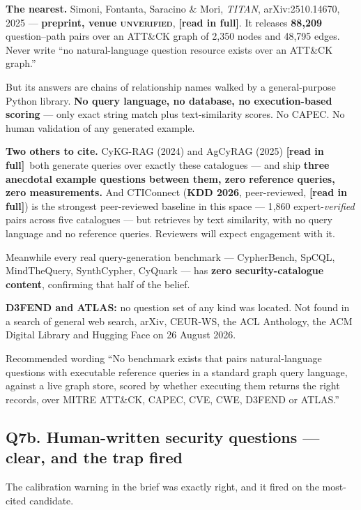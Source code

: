 \documentclass[11pt,a4paper]{article}
\newcommand{\vclear}{\textcolor{clear}{\textbf{clear}}}
\newcommand{\readtag}{\textcolor{standing}{\textbf{[read in full]}}}
\newcommand{\unver}{\textcolor{killed}{\textsc{unverified}}}
\begin{document}
\textbf{The nearest.} Simoni, Fontanta, Saracino \& Mori, \emph{TITAN},
arXiv:2510.14670, 2025 --- \textbf{preprint, venue \unver}, \readtag. It releases
\textbf{88{,}209} question--path pairs over an ATT\&CK graph of 2{,}350 nodes and
48{,}795 edges. Never write ``no natural-language question resource exists over an
ATT\&CK graph.''

But its answers are chains of relationship names walked by a general-purpose Python
library. \textbf{No query language, no database, no execution-based scoring} --- only
exact string match plus text-similarity scores. No CAPEC. No human validation of any
generated example.

\textbf{Two others to cite.} CyKG-RAG (2024) and AgCyRAG (2025) \readtag\ both
generate queries over exactly these catalogues --- and ship \textbf{three anecdotal
example questions between them, zero reference queries, zero measurements.} And
CTIConnect (\textbf{KDD 2026}, peer-reviewed, \readtag) is the strongest
peer-reviewed baseline in this space --- 1{,}860 expert-\emph{verified} pairs across
five catalogues --- but retrieves by text similarity, with no query language and no
reference queries. Reviewers will expect engagement with it.

Meanwhile every real query-generation benchmark --- CypherBench, SpCQL,
MindTheQuery, SynthCypher, CyQuark --- has \textbf{zero security-catalogue content},
confirming that half of the belief.

\textbf{D3FEND and ATLAS:} no question set of any kind was located. Not found in a
search of general web search, arXiv, CEUR-WS, the ACL Anthology, the ACM Digital
Library and Hugging Face on 26 August 2026.

\begin{keybox}{Recommended wording}
``No benchmark exists that pairs natural-language questions with executable
reference queries in a standard graph query language, against a live graph store,
scored by whether executing them returns the right records, over MITRE ATT\&CK,
CAPEC, CVE, CWE, D3FEND or ATLAS.''
\end{keybox}

\subsection{Q7b. Human-written security questions --- \texorpdfstring{\vclear}{clear}, and the trap fired}

The calibration warning in the brief was exactly right, and it fired on the
most-cited candidate.
\end{document}
